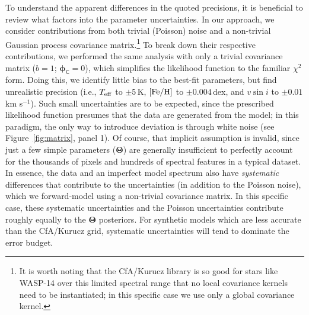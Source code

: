\documentclass[iop,floatfix]{emulateapj}
\newcommand{\vT}{ {\bm \Theta}}
\newcommand{\vp}{ {\bm \phi}}
\newcommand{\cov}{ \vp_{\mathsf{C}}}
\begin{document}
To understand the apparent differences in the quoted precisions, it is
beneficial to review what factors into the parameter uncertainties.  In our
approach, we consider contributions from both trivial (Poisson) noise and a
non-trivial Gaussian process covariance matrix.\footnote{It is worth noting
  that the {\sc CfA/Kurucz} library is so good for stars like WASP-14 over this
  limited spectral range that no local covariance kernels need to be
  instantiated; in this specific case we use only a global covariance kernel.}
  To break down their respective contributions, we performed the same analysis
  with only a trivial covariance matrix ($b = 1$; $\cov = 0$), which simplifies
  the likelihood function to the familiar $\chi^2$ form.  Doing this, we
  identify little bias to the best-fit parameters, but find unrealistic
  precision (i.e., $T_{\rm eff}$ to $\pm$5\,K, $[{\rm Fe/H}]$ to
  $\pm0.004$\,dex, and $v \sin i$ to $\pm0.01$\,km s$^{-1}$).  Such small
  uncertainties are to be expected, since the prescribed likelihood function
  presumes that the data are generated from the model; in this paradigm, the
  only way to introduce deviation is through white noise (see
  Figure~\ref{fig:matrix}, panel 1).  Of course, that implicit assumption is
  invalid, since just a few simple parameters ($\vT$) are generally
  insufficient to perfectly account for the thousands of pixels and hundreds of
  spectral features in a typical dataset.  In essence, the data and an
  imperfect model spectrum also have {\it systematic} differences that
  contribute to the uncertainties (in addition to the Poisson noise), which we
  forward-model using a non-trivial covariance matrix.  In this specific case,
  these systematic uncertainties and the Poisson uncertainties contribute
  roughly equally to the $\vT$ posteriors. For synthetic models which are less
  accurate than the {\sc CfA/Kurucz} grid, systematic uncertainties will tend
  to dominate the error budget.
\end{document}
